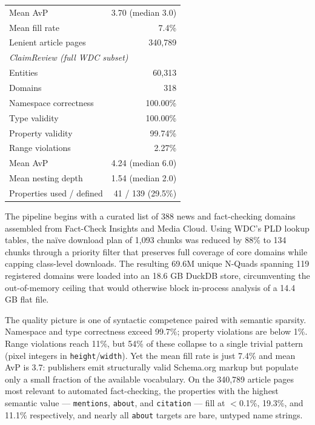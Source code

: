 \documentclass[11pt,a4paper]{article}
\begin{document}
\begin{table}[H]
\begin{tabular}{lr}
Mean AvP & 3.70 (median 3.0) \\
Mean fill rate & 7.4\% \\
Lenient article pages & 340{,}789 \\
\midrule
\multicolumn{2}{l}{\textit{ClaimReview (full WDC subset)}} \\
Entities & 60{,}313 \\
Domains & 318 \\
Namespace correctness & 100.00\% \\
Type validity & 100.00\% \\
Property validity & 99.74\% \\
Range violations & 2.27\% \\
Mean AvP & 4.24 (median 6.0) \\
Mean nesting depth & 1.54 (median 2.0) \\
Properties used / defined & 41 / 139 (29.5\%) \\
\bottomrule
\end{tabular}
\end{table}

\noindent
The pipeline begins with a curated list of 388 news and fact-checking domains
assembled from Fact-Check Insights and Media Cloud.  Using WDC's PLD lookup
tables, the na\"ive download plan of 1{,}093 chunks was reduced by 88\% to
134 chunks through a priority filter that preserves full coverage of core
domains while capping class-level downloads.  The resulting 69.6M unique
N-Quads spanning 119 registered domains were loaded into an 18.6 GB DuckDB
store, circumventing the out-of-memory ceiling that would otherwise block
in-process analysis of a 14.4 GB flat file.

The quality picture is one of syntactic competence paired with semantic
sparsity.  Namespace and type correctness exceed 99.7\%; property violations
are below 1\%.  Range violations reach 11\%, but 54\% of these collapse to
a single trivial pattern (pixel integers in \texttt{height}/\texttt{width}).
Yet the mean fill rate is just 7.4\% and mean AvP is 3.7: publishers emit
structurally valid Schema.org markup but populate only a small fraction of
the available vocabulary.  On the 340{,}789 article pages most relevant to
automated fact-checking, the properties with the highest semantic value ---
\texttt{mentions}, \texttt{about}, and \texttt{citation} --- fill at
$<$0.1\%, 19.3\%, and 11.1\% respectively, and nearly all \texttt{about}
targets are bare, untyped name strings.
\end{document}
